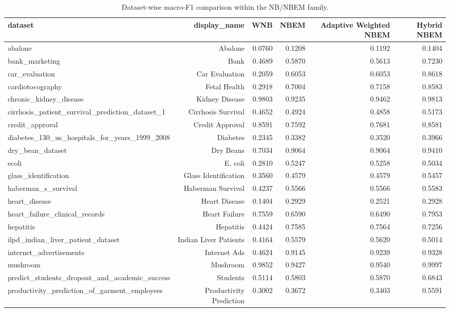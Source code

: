 \begin{table}[!htbp]
\centering
\scriptsize
\caption{Dataset-wise macro-F1 comparison within the NB/NBEM family.}
\label{tab:dataset_macro_f1}
\begin{adjustbox}{max width=\textwidth}
\begin{tabular}{lrrrrr}
\toprule
dataset & display\_name & WNB & NBEM & Adaptive Weighted NBEM & Hybrid NBEM \\
\midrule
abalone & Abalone & 0.0760 & 0.1208 & 0.1192 & 0.1404 \\
bank\_marketing & Bank & 0.4689 & 0.5870 & 0.5613 & 0.7230 \\
car\_evaluation & Car Evaluation & 0.2059 & 0.6053 & 0.6053 & 0.8618 \\
cardiotocography & Fetal Health & 0.2918 & 0.7004 & 0.7158 & 0.8583 \\
chronic\_kidney\_disease & Kidney Disease & 0.9803 & 0.9235 & 0.9462 & 0.9813 \\
cirrhosis\_patient\_survival\_prediction\_dataset\_1 & Cirrhosis Survival & 0.4652 & 0.4924 & 0.4858 & 0.5173 \\
credit\_approval & Credit Approval & 0.8591 & 0.7592 & 0.7681 & 0.8581 \\
diabetes\_130\_us\_hospitals\_for\_years\_1999\_2008 & Diabetes & 0.2345 & 0.3382 & 0.3520 & 0.3966 \\
dry\_bean\_dataset & Dry Beans & 0.7034 & 0.9064 & 0.9064 & 0.9410 \\
ecoli & E. coli & 0.2810 & 0.5247 & 0.5258 & 0.5034 \\
glass\_identification & Glass Identification & 0.3560 & 0.4579 & 0.4579 & 0.5457 \\
haberman\_s\_survival & Haberman Survival & 0.4237 & 0.5566 & 0.5566 & 0.5583 \\
heart\_disease & Heart Disease & 0.1404 & 0.2929 & 0.2521 & 0.2928 \\
heart\_failure\_clinical\_records & Heart Failure & 0.7559 & 0.6590 & 0.6490 & 0.7953 \\
hepatitis & Hepatitis & 0.4424 & 0.7585 & 0.7564 & 0.7256 \\
ilpd\_indian\_liver\_patient\_dataset & Indian Liver Patients & 0.4164 & 0.5579 & 0.5620 & 0.5014 \\
internet\_advertisements & Internet Ads & 0.4624 & 0.9145 & 0.9239 & 0.9328 \\
mushroom & Mushroom & 0.9852 & 0.9427 & 0.9540 & 0.9997 \\
predict\_students\_dropout\_and\_academic\_success & Students & 0.5114 & 0.5803 & 0.5870 & 0.6843 \\
productivity\_prediction\_of\_garment\_employees & Productivity Prediction & 0.3002 & 0.3672 & 0.3403 & 0.5591 \\
\bottomrule
\end{tabular}
\end{adjustbox}
\end{table}
